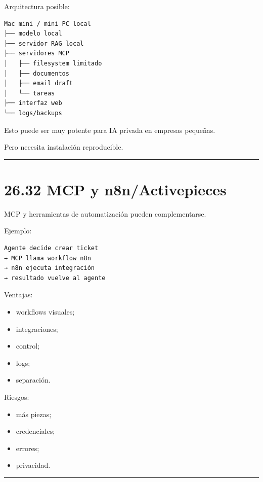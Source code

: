 Arquitectura posible:

\begin{lstlisting}
Mac mini / mini PC local
├── modelo local
├── servidor RAG local
├── servidores MCP
│   ├── filesystem limitado
│   ├── documentos
│   ├── email draft
│   └── tareas
├── interfaz web
└── logs/backups
\end{lstlisting}

Esto puede ser muy potente para IA privada en empresas pequeñas.

Pero necesita instalación reproducible.

\begin{center}\rule{0.5\linewidth}{0.5pt}\end{center}

\section{26.32 MCP y n8n/Activepieces}\label{mcp-y-n8nactivepieces}

MCP y herramientas de automatización pueden complementarse.

Ejemplo:

\begin{lstlisting}
Agente decide crear ticket
→ MCP llama workflow n8n
→ n8n ejecuta integración
→ resultado vuelve al agente
\end{lstlisting}

Ventajas:

\begin{itemize}
\tightlist
\item
  workflows visuales;
\item
  integraciones;
\item
  control;
\item
  logs;
\item
  separación.
\end{itemize}

Riesgos:

\begin{itemize}
\tightlist
\item
  más piezas;
\item
  credenciales;
\item
  errores;
\item
  privacidad.
\end{itemize}

\begin{center}\rule{0.5\linewidth}{0.5pt}\end{center}

